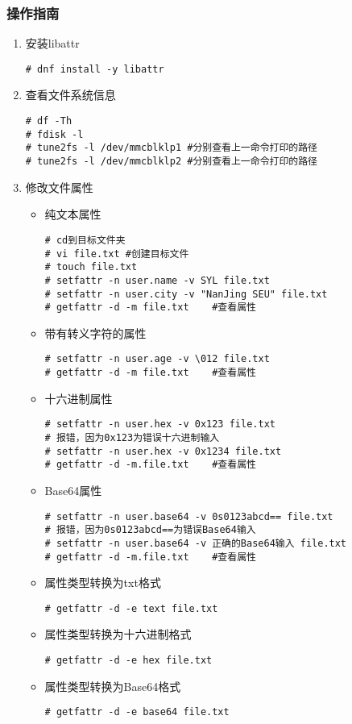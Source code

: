 \documentclass{article}
\begin{document}
\subsubsection{操作指南}
\begin{enumerate}
    \item 安装libattr
\begin{lstlisting}
# dnf install -y libattr
\end{lstlisting}

    \item 查看文件系统信息
\begin{lstlisting}
# df -Th
# fdisk -l
# tune2fs -l /dev/mmcblklp1 #分别查看上一命令打印的路径
# tune2fs -l /dev/mmcblklp2 #分别查看上一命令打印的路径
\end{lstlisting}
    \item 修改文件属性
    \begin{itemize}
        \item 纯文本属性
\begin{lstlisting}
# cd到目标文件夹
# vi file.txt #创建目标文件
# touch file.txt
# setfattr -n user.name -v SYL file.txt
# setfattr -n user.city -v "NanJing SEU" file.txt
# getfattr -d -m file.txt    #查看属性
\end{lstlisting}
        \item 带有转义字符的属性
\begin{lstlisting}
# setfattr -n user.age -v \012 file.txt
# getfattr -d -m file.txt    #查看属性
\end{lstlisting}
        \item 十六进制属性
\begin{lstlisting}
# setfattr -n user.hex -v 0x123 file.txt
# 报错，因为0x123为错误十六进制输入
# setfattr -n user.hex -v 0x1234 file.txt
# getfattr -d -m.file.txt    #查看属性
\end{lstlisting}
        \item Base64属性
\begin{lstlisting}
# setfattr -n user.base64 -v 0s0123abcd== file.txt
# 报错，因为0s0123abcd==为错误Base64输入
# setfattr -n user.base64 -v 正确的Base64输入 file.txt
# getfattr -d -m.file.txt    #查看属性
\end{lstlisting}
        \item 属性类型转换为txt格式
\begin{lstlisting}
# getfattr -d -e text file.txt
\end{lstlisting}
        \item 属性类型转换为十六进制格式
\begin{lstlisting}
# getfattr -d -e hex file.txt
\end{lstlisting}
        \item 属性类型转换为Base64格式
\begin{lstlisting}
# getfattr -d -e base64 file.txt
\end{lstlisting}
    \end{itemize}
\end{enumerate}
\newpage
\end{document}
